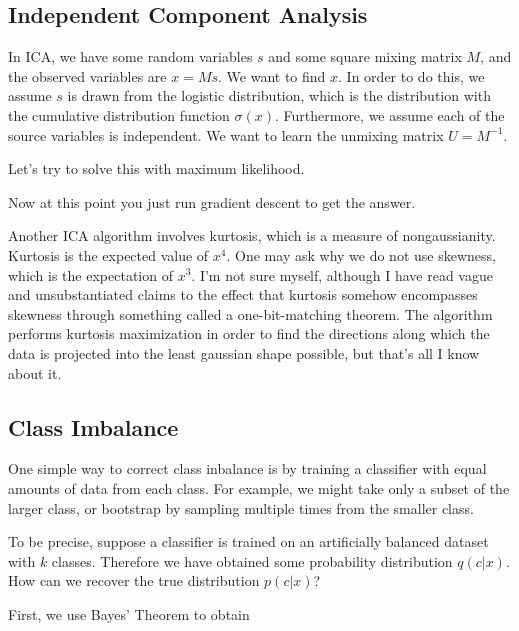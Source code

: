 \documentclass[12pt]{article}
\begin{document}
\subsection{Independent Component Analysis}

In ICA, we have some random variables $s$ and some square mixing matrix $M$, and the observed variables are $x = Ms$. We want to find $x$. In order to do this, we assume $s$ is drawn from the logistic distribution, which is the distribution with the cumulative distribution function $\sigma(x)$. Furthermore, we assume each of the source variables is independent. We want to learn the unmixing matrix $U = M^{-1}$. 

Let's try to solve this with maximum likelihood.


Now at this point you just run gradient descent to get the answer. 

Another ICA algorithm involves kurtosis, which is a measure of nongaussianity. Kurtosis is the expected value of $x^4$. One may ask why we do not use skewness, which is the expectation of $x^3$. I'm not sure myself, although I have read vague and unsubstantiated claims to the effect that kurtosis somehow encompasses skewness through something called a one-bit-matching theorem.
The algorithm performs kurtosis maximization in order to find the directions along which the data is projected into the least gaussian shape possible, but that's all I know about it.

\subsection{Class Imbalance}

One simple way to correct class inbalance is by training a classifier with equal amounts of data from each class. For example, we might take only a subset of the larger class, or bootstrap by sampling multiple times from the smaller class.

To be precise, suppose a classifier is trained on an artificially balanced dataset with $k$ classes. Therefore we have obtained some probability distribution $q(c|x)$. How can we recover the true distribution $p(c|x)$?

First, we use Bayes' Theorem to obtain
\end{document}
